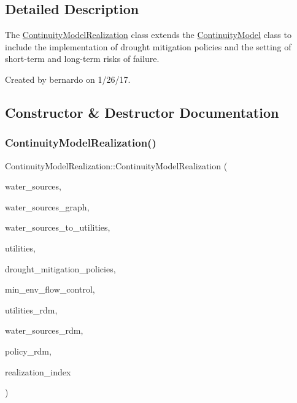 \subsection{Detailed Description}
The \mbox{\hyperlink{classContinuityModelRealization}{Continuity\+Model\+Realization}} class extends the \mbox{\hyperlink{classContinuityModel}{Continuity\+Model}} class to include the implementation of drought mitigation policies and the setting of short-\/term and long-\/term risks of failure.

Created by bernardo on 1/26/17. 

\subsection{Constructor \& Destructor Documentation}
\mbox{\label{classContinuityModelRealization_a641c096ac73586597b3e21a5d516c923}} 
\subsubsection{\texorpdfstring{Continuity\+Model\+Realization()}{ContinuityModelRealization()}}
{\footnotesize\ttfamily Continuity\+Model\+Realization\+::\+Continuity\+Model\+Realization (\begin{DoxyParamCaption}\item[{vector$<$ \mbox{\hyperlink{classWaterSource}{Water\+Source}} $\ast$$>$ \&}]{water\+\_\+sources,  }\item[{const Graph \&}]{water\+\_\+sources\+\_\+graph,  }\item[{const vector$<$ vector$<$ int $>$$>$ \&}]{water\+\_\+sources\+\_\+to\+\_\+utilities,  }\item[{vector$<$ \mbox{\hyperlink{classUtility}{Utility}} $\ast$$>$ \&}]{utilities,  }\item[{const vector$<$ Drought\+Mitigation\+Policy $\ast$$>$ \&}]{drought\+\_\+mitigation\+\_\+policies,  }\item[{vector$<$ Min\+Env\+Flow\+Control $\ast$$>$ \&}]{min\+\_\+env\+\_\+flow\+\_\+control,  }\item[{vector$<$ double $>$ \&}]{utilities\+\_\+rdm,  }\item[{vector$<$ double $>$ \&}]{water\+\_\+sources\+\_\+rdm,  }\item[{vector$<$ double $>$ \&}]{policy\+\_\+rdm,  }\item[{const unsigned int}]{realization\+\_\+index }\end{DoxyParamCaption})}



